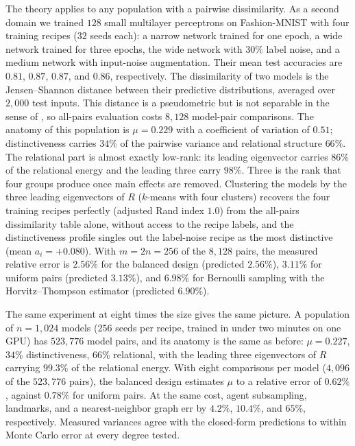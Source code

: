 \documentclass[twoside,11pt]{article}
\begin{document}
The theory applies to any population with a pairwise dissimilarity. As a
second domain we trained $128$ small multilayer perceptrons on
Fashion-MNIST with four training recipes ($32$ seeds each): a narrow network
trained for one epoch, a wide network trained for three epochs, the wide
network with $30\%$ label noise, and a medium network with input-noise
augmentation. Their mean test accuracies are $0.81$, $0.87$, $0.87$, and $0.86$, respectively.
The dissimilarity of two models is the Jensen--Shannon distance between
their predictive distributions, averaged over $2{,}000$ test inputs. This
distance is a pseudometric but is not separable in the sense of
, so all-pairs evaluation costs
$8{,}128$ model-pair comparisons. The anatomy of this population is
${\mu=0.229}$ with a coefficient of variation of $0.51$; distinctiveness carries
$34\%$ of the pairwise variance and relational structure $66\%$. The relational part is almost
exactly low-rank: its leading eigenvector carries $86\%$ of the relational
energy and the leading three carry $98\%$. Three is the rank that four
groups produce once main effects are removed. Clustering the models by
the three leading eigenvectors of $R$ ($k$-means with four clusters)
recovers the four training recipes perfectly (adjusted Rand index $1.0$)
from the all-pairs dissimilarity table alone, without access to the recipe labels, and the
distinctiveness profile singles out the label-noise recipe as the most
distinctive (mean $a_i=+0.080$). With
$m=2n=256$ of the $8{,}128$ pairs, the measured relative error is $2.56\%$
for the balanced design (predicted $2.56\%$), $3.11\%$ for uniform pairs
(predicted $3.13\%$), and $6.98\%$ for Bernoulli sampling with the
Horvitz--Thompson estimator (predicted $6.90\%$).

The same experiment at eight times the size gives the same picture.
A population of $n=1{,}024$ models ($256$ seeds per recipe, trained in
under two minutes on one GPU) has $523{,}776$ model pairs, and its anatomy is
the same as before: $\mu=0.227$, $34\%$ distinctiveness, $66\%$ relational,
with the leading three eigenvectors of $R$ carrying $99.3\%$ of the
relational energy. With eight comparisons per model ($4{,}096$ of the
$523{,}776$ pairs),
the balanced design estimates $\mu$ to a relative error of $0.62\%$,
against $0.78\%$ for uniform pairs. At the same cost, agent subsampling,
landmarks, and a nearest-neighbor graph err by $4.2\%$, $10.4\%$, and
$65\%$, respectively. Measured variances agree with the closed-form predictions to within
Monte Carlo error at every degree tested.
\end{document}
